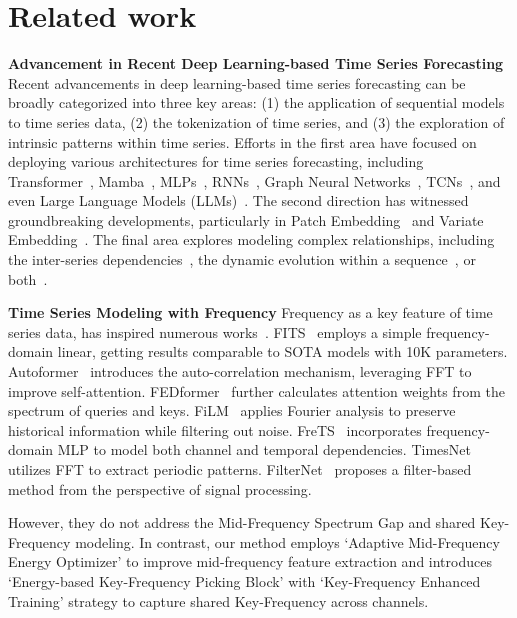 \section{Related work}
\textbf{Advancement in Recent Deep Learning-based Time Series Forecasting \quad} Recent advancements in deep learning-based time series forecasting can be broadly categorized into three key areas: (1) the application of sequential models to time series data, (2) the tokenization of time series, and (3) the exploration of intrinsic patterns within time series. 
%
Efforts in the first area have focused on deploying various architectures for time series forecasting, including Transformer~\citep{Wu2021autoformer,wang2024card}, Mamba~\citep{4mamba,wang2024mamba}, MLPs~\citep{wang2023timemixer,Das2023TiDE,yu2024lino}, RNNs~\citep{lin2023segrnn}, Graph Neural Networks~\citep{shangada2024tsfgnn}, TCNs~\citep{wang2023micn}, and even Large Language Models (LLMs)~\citep{jin2023timellm,liu2024timellm,liu2024autotimes}.
%
The second direction has witnessed groundbreaking developments, particularly in Patch Embedding~\citep{Nie2022patchtst} and Variate Embedding~\citep{LiuiTransformer}.
%
The final area explores modeling complex relationships, including the inter-series dependencies~\citep{Ng2022graphformer, chen2024similarity}, the dynamic evolution within a sequence~\citep{du2022preformer,Zhang2022lightts}, or both~\citep{yu2024leddam,liu2024unitst}. 

\textbf{Time Series Modeling with Frequency \quad} Frequency as a key feature of time series data, has inspired numerous works~\citep{yi2023freqsurvey}.
%
FITS~\citep{xu2024fits} employs a simple frequency-domain linear, getting results comparable to SOTA models with 10K parameters.
%
Autoformer~\citep{Wu2021autoformer} introduces the auto-correlation mechanism, leveraging FFT to improve self-attention. FEDformer~\citep{zhou2022fedformer} further calculates attention weights from the spectrum of queries and keys. FiLM~\citep{Zhou2022film} applies Fourier analysis to preserve historical information while filtering out noise. FreTS~\citep{yi2023fremlp} incorporates frequency-domain MLP to model both channel and temporal dependencies. TimesNet~\citep{wu2022timesnet} utilizes FFT to extract periodic patterns. FilterNet~\citep{yi2024filternet} proposes a filter-based method from the perspective of signal processing. 

However, they do not address the Mid-Frequency Spectrum Gap and shared Key-Frequency modeling. In contrast, our method employs `Adaptive Mid-Frequency Energy Optimizer' to improve mid-frequency feature extraction and introduces `Energy-based Key-Frequency Picking Block' with `Key-Frequency Enhanced Training' strategy to capture shared Key-Frequency across channels.